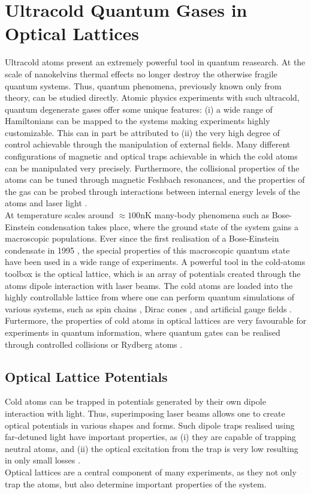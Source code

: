 \chapter{Ultracold Quantum Gases in Optical Lattices}

Ultracold atoms present an extremely powerful tool in quantum reasearch. At the scale of nanokelvins thermal effects no longer destroy the otherwise fragile quantum systems. Thus, quantum phenomena, previously known only from theory, can be studied directly. Atomic physics experiments with such ultracold, quantum degenerate gases offer some unique features: (i) a wide range of Hamiltonians can be mapped to the systems making experiments highly customizable. This can in part be attributed to (ii) the very high degree of control achievable through the manipulation of external fields. Many different configurations of magnetic and optical traps achievable in which the cold atoms can be manipulated very precisely. Furthermore, the collisional properties of the atoms can be tuned through magnetic Feshbach resonances, and the properties of the gas can be probed through interactions between internal energy levels of the atoms and laser light \cite{JakschZoller, Bloch2012}.\\
At temperature scales around $\approx 100 \mathrm{nK}$ many-body phenomena such as Bose-Einstein condensation takes place, where the ground state of the system gains a macroscopic populations. Ever since the first realisation of a Bose-Einstein condensate in 1995 \cite{WiemanCornell1995}, the special properties of this macroscopic quantum state have been used in a wide range of experiments. A powerful tool in the cold-atoms toolbox is the optical lattice, which is an array of potentials created through the atoms dipole interaction with laser beams. The cold atoms are loaded into the highly controllable lattice from where one can perform quantum simulations of various systems, such as spin chains \cite{Simon2011}, Dirac cones \cite{Tarruell2012}, and artificial gauge fields \cite{Dalibard2011}. Furtermore, the properties of cold atoms in optical lattices are very favourable for experiments in quantum information, where quantum gates can be realised through controlled collisions \cite{Zoller1999} or Rydberg atoms \cite{Molmer2010}.

\section{Optical Lattice Potentials}
Cold atoms can be trapped in potentials generated by their own dipole interaction with light. Thus, superimposing laser beams allows one to create optical potentials in various shapes and forms. Such dipole traps realised using far-detuned light have important properties, as (i) they are capable of trapping neutral atoms, and (ii) the optical excitation from the trap is very low resulting in only small losses \cite{grimm}.\\
Optical lattices are a central component of many experiments, as they not only trap the atoms, but also determine important properties of the system.

